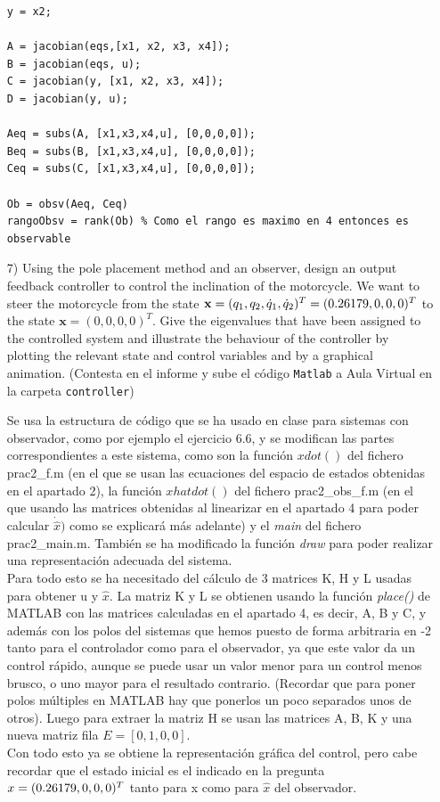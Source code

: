 \documentclass{article}
\begin{document}
\begin{itemize}
\begin{tcolorbox}[width=12cm, title={File \texttt{observability.m}}]
\begin{scriptsize}
\begin{verbatim}
y = x2;

A = jacobian(eqs,[x1, x2, x3, x4]);
B = jacobian(eqs, u);
C = jacobian(y, [x1, x2, x3, x4]);
D = jacobian(y, u);

Aeq = subs(A, [x1,x3,x4,u], [0,0,0,0]);
Beq = subs(B, [x1,x3,x4,u], [0,0,0,0]);
Ceq = subs(C, [x1,x3,x4,u], [0,0,0,0]);

Ob = obsv(Aeq, Ceq)
rangoObsv = rank(Ob) % Como el rango es maximo en 4 entonces es observable

\end{verbatim}
\end{scriptsize}
\end{tcolorbox}

\item[7)]  {\color{gray} Using the pole placement method and an observer, design an output feedback controller to control the inclination of the motorcycle. 
We want to steer the motorcycle from the state $\mathbf{x} = (q_1, q_2, \dot{q}_1, \dot{q}_2)^T = (0.26179\if9387799149\fi,0,0,0)^T$ to the state $\mathbf{x} = (0, 0, 0, 0)^T$. 
Give the eigenvalues that have been assigned to the controlled system and illustrate the behaviour of the controller by plotting the relevant state and control variables and by a graphical animation. (Contesta en el informe y sube el c\'odigo \texttt{Matlab} a Aula Virtual en la carpeta \texttt{controller})}

\bigskip

Se usa la estructura de código que se ha usado en clase para sistemas con observador, como por ejemplo el ejercicio 6.6, y se modifican las partes correspondientes a este sistema, como son la función $xdot()$ del fichero prac2\_f.m (en el que se usan las ecuaciones del espacio de estados obtenidas en el apartado 2), la función $xhatdot()$ del fichero prac2\_obs\_f.m (en el que usando las matrices obtenidas al linearizar en el apartado 4 para poder calcular $\dot{\hat{x}})$ como se explicará más adelante) y el \textit{main} del fichero prac2\_main.m. También se ha modificado la función \textit{draw} para poder realizar una representación adecuada del sistema.\\
Para todo esto se ha necesitado del cálculo de 3 matrices K, H y L usadas para obtener u y $\hat{x}$. La matriz K y L se obtienen usando la función \textit{place()} de MATLAB con las matrices calculadas en el apartado 4, es decir, A, B y C, y además con los polos del sistemas que hemos puesto de forma arbitraria en -2 tanto para el controlador como para el observador, ya que este valor da un control rápido, aunque se puede usar un valor menor para un control menos brusco, o uno mayor para el resultado contrario. (Recordar que para poner polos múltiples en MATLAB hay que ponerlos un poco separados unos de otros). Luego para extraer la matriz H se usan las matrices A, B, K y una nueva matriz fila $E = [0,1,0,0]$.\\
Con todo esto ya se obtiene la representación gráfica del control, pero cabe recordar que el estado inicial es el indicado en la pregunta $x = (0.26179\if9387799149\fi,0,0,0)^T$ tanto para x como para $\hat{x}$ del observador.


\end{itemize}
\end{document}
